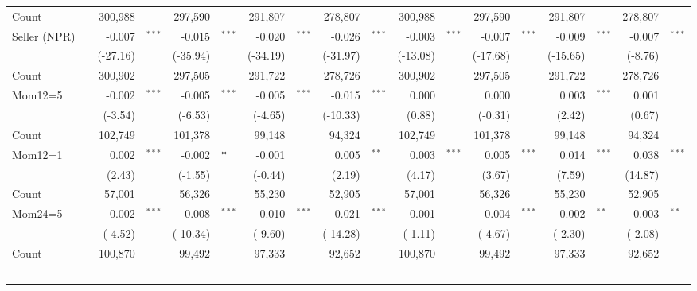 \begin{landscape}
\begin{longtable}{ll*{8}{r@{}>{$}l<{$}}}
Count        &  & 300,988  &     & 297,590  &     & 291,807  &     & 278,807  &     & 300,988  &     & 297,590  &     & 291,807  &     & 278,807 &     \\ \addlinespace   
Seller (NPR) &  & -0.007   & ^{***} & -0.015   & ^{***} & -0.020   & ^{***} & -0.026   & ^{***} & -0.003   & ^{***} & -0.007   & ^{***} & -0.009   & ^{***} & -0.007  & ^{***} \\ \addlinespace
             &  & (-27.16) &     & (-35.94) &     & (-34.19) &     & (-31.97) &     & (-13.08) &     & (-17.68) &     & (-15.65) &     & (-8.76) &     \\*
Count        &  & 300,902  &     & 297,505  &     & 291,722  &     & 278,726  &     & 300,902  &     & 297,505  &     & 291,722  &     & 278,726 &     \\  \addlinespace
Mom12=5      &  & -0.002   & ^{***} & -0.005   & ^{***} & -0.005   & ^{***} & -0.015   & ^{***} & 0.000    &     & 0.000    &     & 0.003    & ^{***} & 0.001   &     \\*
             &  & (-3.54)  &     & (-6.53)  &     & (-4.65)  &     & (-10.33) &     & (0.88)   &     & (-0.31)  &     & (2.42)   &     & (0.67)  &     \\* 
Count        &  & 102,749  &     & 101,378  &     & 99,148   &     & 94,324   &     & 102,749  &     & 101,378  &     & 99,148   &     & 94,324  &     \\ \addlinespace
Mom12=1      &  & 0.002    & ^{***} & -0.002   & *   & -0.001   &     & 0.005    & ^{**}  & 0.003    & ^{***} & 0.005    & ^{***} & 0.014    & ^{***} & 0.038   & ^{***} \\ 
             &  & (2.43)   &     & (-1.55)  &     & (-0.44)  &     & (2.19)   &     & (4.17)   &     & (3.67)   &     & (7.59)   &     & (14.87) &     \\*
Count        &  & 57,001   &     & 56,326   &     & 55,230   &     & 52,905   &     & 57,001   &     & 56,326   &     & 55,230   &     & 52,905  &     \\ \addlinespace
Mom24=5      &  & -0.002   & ^{***} & -0.008   & ^{***} & -0.010   & ^{***} & -0.021   & ^{***} & -0.001   &     & -0.004   & ^{***} & -0.002   & ^{**}  & -0.003  & ^{**}  \\*
             &  & (-4.52)  &     & (-10.34) &     & (-9.60)  &     & (-14.28) &     & (-1.11)  &     & (-4.67)  &     & (-2.30)  &     & (-2.08) &     \\* 
Count        &  & 100,870  &     & 99,492   &     & 97,333   &     & 92,652   &     & 100,870  &     & 99,492   &     & 97,333   &     & 92,652  &     \\ \addlinespace

\end{longtable}
\end{landscape}
